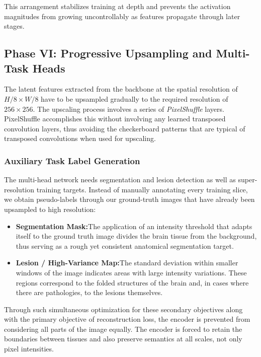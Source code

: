 This arrangement stabilizes training at depth and prevents the activation magnitudes from growing uncontrollably as features propagate through later stages.

\subsection{Phase VI: Progressive Upsampling and Multi-Task Heads}
The latent features extracted from the backbone at the spatial resolution of $H/8 \times W/8$ have to be upsampled gradually to the required resolution of $256 \times 256$. The upscaling process involves a series of \textit{PixelShuffle} layers. PixelShuffle accomplishes this without involving any learned transposed convolution layers, thus avoiding the checkerboard patterns that are typical of transposed convolutions when used for upscaling.

\subsubsection{Auxiliary Task Label Generation}
The multi-head network needs segmentation and lesion detection as well as super-resolution training targets. Instead of manually annotating every training slice, we obtain pseudo-labels through our ground-truth images that have already been upsampled to high resolution:

\begin{itemize}
    \item \textbf{Segmentation Mask:}The application of an intensity threshold that adapts itself to the ground truth image divides the brain tissue from the background, thus serving as a rough yet consistent anatomical segmentation target.
    \item \textbf{Lesion / High-Variance Map:}The standard deviation within smaller windows of the image indicates areas with large intensity variations. These regions correspond to the folded structures of the brain and, in cases where there are pathologies, to the lesions themselves.
\end{itemize}

Through such simultaneous optimization for these secondary objectives along with the primary objective of reconstruction loss, the encoder is prevented from considering all parts of the image equally. The encoder is forced to retain the boundaries between tissues and also preserve semantics at all scales, not only pixel intensities.

